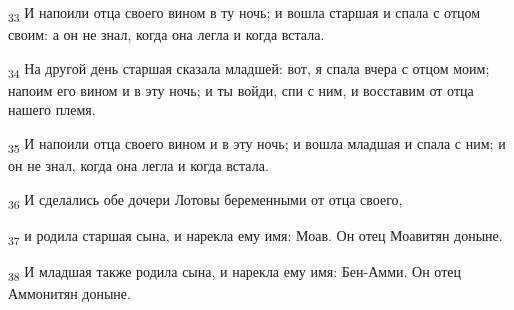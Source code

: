 \begin{tcolorbox}
\textsubscript{33} И напоили отца своего вином в ту ночь; и вошла старшая и спала с отцом своим: а он не знал, когда она легла и когда встала.
\end{tcolorbox}
\begin{tcolorbox}
\textsubscript{34} На другой день старшая сказала младшей: вот, я спала вчера с отцом моим; напоим его вином и в эту ночь; и ты войди, спи с ним, и восставим от отца нашего племя.
\end{tcolorbox}
\begin{tcolorbox}
\textsubscript{35} И напоили отца своего вином и в эту ночь; и вошла младшая и спала с ним; и он не знал, когда она легла и когда встала.
\end{tcolorbox}
\begin{tcolorbox}
\textsubscript{36} И сделались обе дочери Лотовы беременными от отца своего,
\end{tcolorbox}
\begin{tcolorbox}
\textsubscript{37} и родила старшая сына, и нарекла ему имя: Моав. Он отец Моавитян доныне.
\end{tcolorbox}
\begin{tcolorbox}
\textsubscript{38} И младшая также родила сына, и нарекла ему имя: Бен-Амми. Он отец Аммонитян доныне.
\end{tcolorbox}

